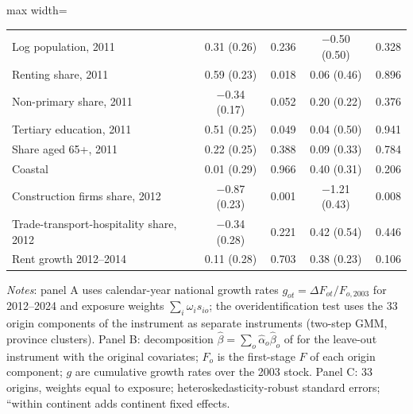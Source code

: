 \begin{table}[!htbp]
\begin{adjustbox}{max width=\linewidth}
\begin{tabular}{lrrrrrr}
Log population, 2011 & \multicolumn{2}{c}{0.31 (0.26)} & 0.236 & \multicolumn{2}{c}{$-$0.50 (0.50)} & 0.328\\
Renting share, 2011 & \multicolumn{2}{c}{0.59 (0.23)} & 0.018 & \multicolumn{2}{c}{0.06 (0.46)} & 0.896\\
Non-primary share, 2011 & \multicolumn{2}{c}{$-$0.34 (0.17)} & 0.052 & \multicolumn{2}{c}{0.20 (0.22)} & 0.376\\
Tertiary education, 2011 & \multicolumn{2}{c}{0.51 (0.25)} & 0.049 & \multicolumn{2}{c}{0.04 (0.50)} & 0.941\\
Share aged 65+, 2011 & \multicolumn{2}{c}{0.22 (0.25)} & 0.388 & \multicolumn{2}{c}{0.09 (0.33)} & 0.784\\
Coastal & \multicolumn{2}{c}{0.01 (0.29)} & 0.966 & \multicolumn{2}{c}{0.40 (0.31)} & 0.206\\
Construction firms share, 2012 & \multicolumn{2}{c}{$-$0.87 (0.23)} & 0.001 & \multicolumn{2}{c}{$-$1.21 (0.43)} & 0.008\\
Trade-transport-hospitality share, 2012 & \multicolumn{2}{c}{$-$0.34 (0.28)} & 0.221 & \multicolumn{2}{c}{0.42 (0.54)} & 0.446\\
Rent growth 2012--2014 & \multicolumn{2}{c}{0.11 (0.28)} & 0.703 & \multicolumn{2}{c}{0.38 (0.23)} & 0.106\\
\bottomrule\end{tabular}\end{adjustbox}
\begin{minipage}{0.97\linewidth}\footnotesize\vspace{4pt}
\textit{Notes}: panel A uses calendar-year national growth rates $g_{ot}=\Delta F_{ot}/F_{o,2003}$ for 2012--2024 and exposure weights $\sum_i\omega_i s_{io}$; the overidentification test uses the 33 origin components of the instrument as separate instruments (two-step GMM, province clusters). Panel B: decomposition $\hat\beta=\sum_o\hat\alpha_o\hat\beta_o$ of \citet{goldsmith2020} for the leave-out instrument with the original covariates; $F_o$ is the first-stage $F$ of each origin component; $g$ are cumulative growth rates over the 2003 stock. Panel C: 33 origins, weights equal to exposure; heteroskedasticity-robust standard errors; ``within continent adds continent fixed effects.
\end{minipage}\end{table}